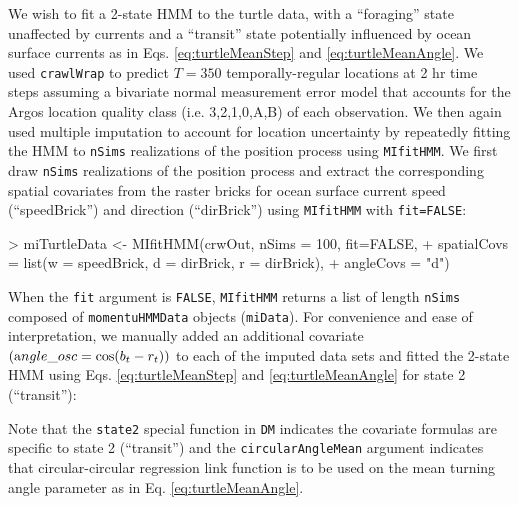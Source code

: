 \documentclass[12pt]{article}
\begin{document}
We wish to fit a 2-state HMM to the turtle data, with a ``foraging'' state unaffected by currents and a ``transit'' state potentially influenced by ocean surface currents as in Eqs. \ref{eq:turtleMeanStep} and \ref{eq:turtleMeanAngle}.  We used \verb|crawlWrap| to predict $T=350$ temporally-regular locations at 2 hr time steps assuming a bivariate normal measurement error model that accounts for the Argos location quality class  (i.e. 3,2,1,0,A,B) of each observation. We then again used multiple imputation to account for location uncertainty by repeatedly fitting the HMM to \verb|nSims| realizations of the position process using \verb|MIfitHMM|. We first draw \verb|nSims| realizations of the position process and extract the corresponding spatial covariates from the raster bricks for ocean surface current speed (``speedBrick'') and direction (``dirBrick'') using \verb|MIfitHMM| with \verb|fit=FALSE|:
\begin{Schunk}
\begin{Sinput}
> miTurtleData <- MIfitHMM(crwOut, nSims = 100, fit=FALSE,
+                  spatialCovs = list(w = speedBrick, d = dirBrick, r = dirBrick),
+                  angleCovs = "d")
\end{Sinput}
\end{Schunk}
When the \verb|fit| argument is \verb|FALSE|, \verb|MIfitHMM| returns a list of length \verb|nSims| composed of \verb|momentuHMMData| objects (\verb|miData|). For convenience and ease of interpretation, we manually added an additional covariate $\left({\text angle\_osc}=\cos(b_t-r_t)\right)$ to each of the imputed data sets and fitted the 2-state HMM using Eqs. \ref{eq:turtleMeanStep} and \ref{eq:turtleMeanAngle} for state 2 (``transit''):
\begin{Schunk}
\end{Schunk}
Note that the \verb|state2| special function in \verb|DM| indicates the covariate formulas are specific to state 2 (``transit'') and the \verb|circularAngleMean| argument indicates that circular-circular regression link function is to be used on the mean turning angle parameter as in Eq. \ref{eq:turtleMeanAngle}. 
\end{document}
